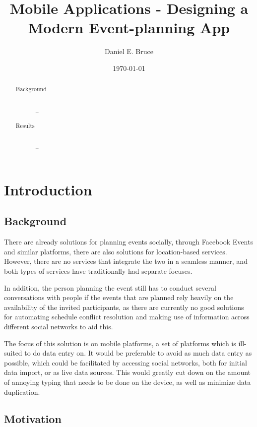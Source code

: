 \documentclass[a4paper,11pt]{report}
\begin{document}
\title{Mobile Applications - Designing a Modern Event-planning App}
\author{Daniel E. Bruce}
\date{\today}
\maketitle

\begin{abstract}
  \begin{description}
    \item[Background] \hfill \\
      --
    \item[Results] \hfill \\
      --
  \end{description}
\end{abstract}

\tableofcontents

\chapter{Introduction}

\section{Background}

There are already solutions for planning events socially, through Facebook
Events and similar platforms, there are also solutions for location-based
services. However, there are no services that integrate the two in a seamless
manner, and both types of services have traditionally had separate focuses.

In addition, the person planning the event still has to conduct several
conversations with people if the events that are planned rely heavily on the
availability of the invited participants, as there are currently no good
solutions for automating schedule conflict resolution and making use of
information across different social networks to aid this.

The focus of this solution is on mobile platforms, a set of platforms which is
ill-suited to do data entry on\cite{brown:fourkey}. It would be preferable to
avoid as much data entry as possible, which could be facilitated by accessing
social networks, both for initial data import, or as live data sources. This
would greatly cut down on the amount of annoying typing that needs to be done on
the device, as well as minimize data duplication.

\section{Motivation}
\end{document}

